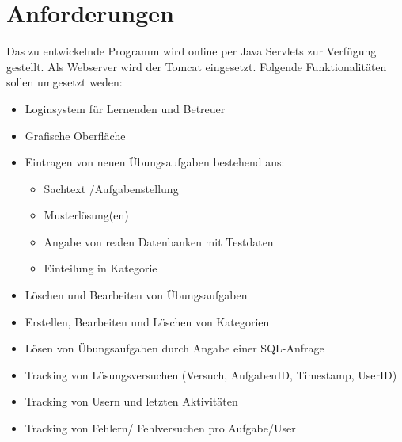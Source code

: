 \section{Anforderungen}

Das zu entwickelnde Programm wird online per Java Servlets zur Verfügung gestellt. Als Webserver wird der Tomcat eingesetzt. Folgende Funktionalitäten sollen umgesetzt weden:

\begin{itemize}
\item Loginsystem für Lernenden und Betreuer
\item Grafische Oberfläche
\item Eintragen von neuen Übungsaufgaben bestehend aus:
	\begin{itemize}
	\item Sachtext /Aufgabenstellung
	\item Musterlösung(en)
	\item Angabe von realen Datenbanken mit Testdaten
	\item Einteilung in Kategorie
	\end{itemize}
\item Löschen und Bearbeiten von Übungsaufgaben
\item Erstellen, Bearbeiten und Löschen von Kategorien
\item Lösen von Übungsaufgaben durch Angabe einer SQL-Anfrage
\item Tracking von Lösungsversuchen (Versuch, AufgabenID, Timestamp, UserID)
\item Tracking von Usern und letzten Aktivitäten
\item Tracking von Fehlern/ Fehlversuchen pro Aufgabe/User
\end{itemize}